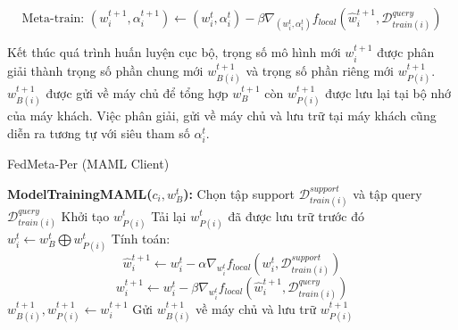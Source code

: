 \begin{dmath}
    \text{Meta-train: } (w_{i}^{t+1}, \alpha_i^{t+1}) \gets (w_{i}^t, \alpha_{i}^{t}) - \beta\nabla_{(w_i^t, \alpha_i^t)} f_{local}(\hat{w}_{i}^{t+1}, \mathcal{D}_{train(i)}^{query})
\end{dmath}

Kết thúc quá trình huấn luyện cục bộ, trọng số mô hình mới $w_i^{t+1}$ được phân giải thành trọng số phần chung mới $w_{B(i)}^{t+1}$ và trọng số phần riêng mới $w_{P(i)}^{t+1}$. $w_{B(i)}^{t+1}$ được gửi về máy chủ để tổng hợp $w_B^{t+1}$ còn $w_{P(i)}^{t+1}$ được lưu lại tại bộ nhớ của máy khách. Việc phân giải, gửi về máy chủ và lưu trữ tại máy khách cũng diễn ra tương tự với siêu tham số $\alpha_i^t$.

\begin{algorithm}[H]
    \caption{FedMeta-Per (MAML Client)} \label{alg:fedmaml_per_client}
    \begin{algorithmic}[1]
        \State\textbf{ModelTrainingMAML($c_i, w_B^t$):}
        \State Chọn tập support $\mathcal{D}_{train(i)}^{support}$ và tập query $\mathcal{D}_{train(i)}^{query}$
            \State Khởi tạo $w_{P(i)}^t$
        \Else
            \State Tải lại $w_{P(i)}^t$ đã được lưu trữ trước đó
        \EndIf
        \State $w_i^t \gets w_B^t \bigoplus w_{P(i)}^t$ 
        \State Tính toán: 
        \begin{dmath*}
            \hat{w}_{i}^{t+1} \gets w_{i}^t - \alpha\nabla_{w_i^t} f_{local}(w_{i}^t, \mathcal{D}_{train(i)}^{support})
        \end{dmath*}
        \begin{dmath*}
            w_{i}^{t+1} \gets w_{i}^t - \beta\nabla_{w_i^t} f_{local}(\hat{w}_{i}^{t+1}, \mathcal{D}_{train(i)}^{query})
        \end{dmath*}
        \State $w_{B(i)}^{t+1}, w_{P(i)}^{t+1} \gets w_i^{t+1}$ 
        \State Gửi $w_{B(i)}^{t+1}$ về máy chủ và lưu trữ $w_{P(i)}^{t+1}$
    \end{algorithmic}
\end{algorithm}

